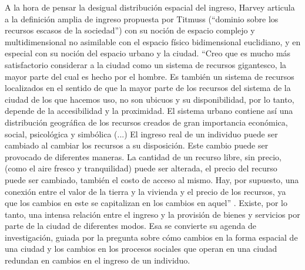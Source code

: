 A la hora de pensar la desigual distribución espacial del ingreso, Harvey articula a la definición amplia de ingreso propuesta por Titmuss (“dominio sobre los recursos escasos de la sociedad”) con su noción de espacio complejo y multidimensional no asimilable con el espacio físico bidimensional euclidiano, y en especial con su noción del espacio urbano y la ciudad. “Creo que es mucho más satisfactorio considerar a la ciudad como un sistema de recursos gigantesco, la mayor parte del cual es hecho por el hombre. Es también un sistema de recursos localizados en el sentido de que la mayor parte de los recursos del sistema de la ciudad de los que hacemos uso, no son ubicuos y su disponibilidad, por lo tanto, depende de la accesibilidad y la proximidad. El sistema urbano contiene así una distribución geográfica de los recursos creados de gran importancia económica, social, psicológica y simbólica (...) El ingreso real de un individuo puede ser cambiado al cambiar los recursos a su disposición. Este cambio puede ser provocado de diferentes maneras. La cantidad de un recurso libre, sin precio, (como el aire fresco y tranquilidad) puede ser alterada, el precio del recurso puede ser cambiado, también el costo de acceso al mismo. Hay, por supuesto, una conexión entre el valor de la tierra y la vivienda y el precio de los recursos, ya que los cambios en este se capitalizan en los cambios en aquel” \cite[p.~68]{harvey}. Existe, por lo tanto, una intensa relación entre el ingreso y la provisión de bienes y servicios por parte de la ciudad de diferentes modos. Esa se convierte su agenda de investigación, guiada por la pregunta sobre cómo cambios en la forma espacial de una ciudad y los cambios en los procesos sociales que operan en una ciudad redundan en cambios en el ingreso de un individuo. 

